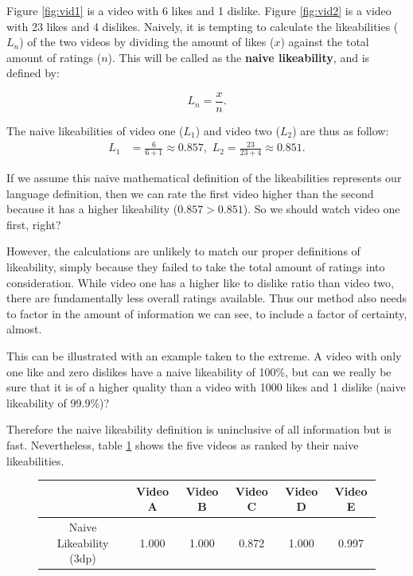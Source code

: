\documentclass[a4paper,11pt]{article}
\begin{document}
Figure \ref{fig:vid1} is a video with 6 likes and 1 dislike. Figure \ref{fig:vid2} is a video with 23 likes and 4 dislikes. Naively, it is tempting to calculate the likeabilities ($L_n$) of the two videos by dividing the amount of likes ($x$) against the total amount of ratings ($n$). This will be called as the \textbf{naive likeability}, and is defined by:

\[
L_n = \frac{x}{n}.
\]

The naive likeabilities of video one ($L_1$) and video two ($L_2$) are thus as follow:
\begin{align*}
    L_{1} &= \frac{6}{6+1} \approx 0.857, \,\, L_{2} = \frac{23}{23 + 4} \approx 0.851.
\end{align*}

If we assume this naive mathematical definition of the likeabilities represents our language definition, then we can rate the first video higher than the second because it has a higher likeability ($0.857 > 0.851$). So we should watch video one first, right?

However, the calculations are unlikely to match our proper definitions of likeability, simply because they failed to take the total amount of ratings into consideration. While video one has a higher like to dislike ratio than video two, there are fundamentally less overall ratings available. Thus our method also needs to factor in the amount of information we can see, to include a factor of certainty, almost.

This can be illustrated with an example taken to the extreme. A video with only one like and zero dislikes have a naive likeability of 100\%, but can we really be sure that it is of a higher quality than a video with 1000 likes and 1 dislike (naive likeability of 99.9\%)?

Therefore the naive likeability definition is uninclusive of all information but is fast. Nevertheless, table \ref{tbl:naive} shows the five videos as ranked by their naive likeabilities.

\begin{figure}[H]
    \centering
    \begin{tabular}{c|c|c|c|c|c}
        & Video A & Video B & Video C & Video D & Video E \\
        \hline
        \hline
        Naive Likeability (3dp) & 1.000 & 1.000 & 0.872 & 1.000 & 0.997
    \end{tabular}
    \label{tbl:naive}
\end{figure}
\end{document}

